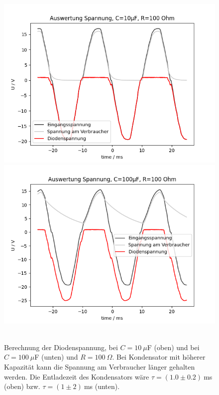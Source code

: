\documentclass{article}
\begin{document}
\begin{figure}[H]
\caption{Berechnung der Diodenspannung, bei $C = 10~\mu$F (oben) und bei $C = 100~\mu$F (unten) und $R = 100~\Omega$. Bei Kondensator mit höherer Kapazität kann die Spannung am Verbraucher länger gehalten werden. Die Entladezeit des Kondensators wäre $\tau = (1.0\pm0.2)~$ms (oben) bzw. $\tau = (1\pm 2)~$ms (unten).}
\label{fig:grafik_task3_auswertung_10_und_100_R100}
{\centering
\includegraphics[scale=0.6]{bilder/task3_auswertung_10mu_R100.png}
\includegraphics[scale=0.6]{bilder/task3_auswertung_100mu_R100.png}
~
}
\end{figure}
\end{document}
